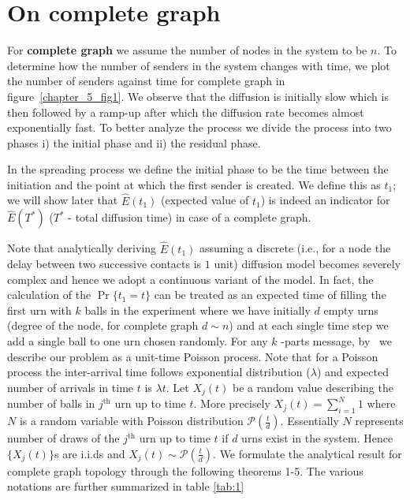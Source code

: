 \noindent
\section{On complete graph}
\label{res_complete}
\noindent For {\bf complete graph} we assume the
number of nodes in the system to be $n$. 
To determine how the number of
senders in the system changes with time, we plot the number of senders
against time for complete graph in figure~\ref{chapter_5_fig1}. 
We observe that the diffusion is initially slow which is then followed by a ramp-up after which the diffusion rate becomes almost exponentially fast.
To better analyze the process we divide the process into two phases i) the initial phase and ii) the residual phase. 


  In the spreading process we define the initial phase to be the time between the
initiation and the point at which the first sender is created. We
define this as $t_1$; we will show later that $\hat E(t_1)$ (expected value of $t_1$) is
indeed an indicator for $\hat E(T^*)$ ($T^*$ - 
total diffusion time) in case of a complete graph.

Note that analytically deriving  $\hat E(t_1)$ assuming a  discrete 
(i.e., for a node the delay between two successive contacts is $1$ unit) diffusion model becomes severely complex and hence we adopt a continuous 
variant of the model. In fact, the calculation of the $\Pr \{ t_{1}=t\}$ can be treated as an expected time of filling the first urn with $k$
balls in the experiment where we have initially $d$ empty urns (degree of the node, for complete graph $d \sim n$) and at each
single time step we add a single ball to one urn chosen randomly. 
 For any $k$%
-parts message, by~\cite{kaplan1977generalization} we describe our problem
as a unit-time Poisson process. Note that for a Poisson process the inter-arrival time follows exponential distribution ($\lambda$) and expected number of arrivals in time $t$ is $\lambda t$.  
 Let 
$X_{j}(t)$ be a random value describing the number of balls in $j^\textrm{th}$ urn up
to time $t$. More precisely $X_{j}(t)=\sum_{i=1}^{N}1$ where $N$ is a random variable 
with Poisson distribution $\mathcal{P}(\frac{t}{d})$. Essentially $N$ represents number of draws
of the $j^\textrm{th}$ urn up to time $t$ if $d$ urns exist in the system.
Hence $\{X_{j}(t)\}$s are i.i.ds and $X_{j}(t)\sim\mathcal{P}(\frac{t}{d}%
) $.  
{We formulate the analytical result for complete graph topology through the following theorems 1-5. The various notations are further 
summarized in table \ref{tab:1}}



